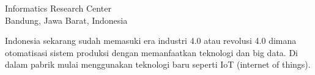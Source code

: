 

{Informatics Research Center\\
Bandung, Jawa Barat, Indonesia}

Indonesia sekarang sudah memasuki era industri 4.0 atau revolusi 4.0 dimana otomatisasi sistem produksi dengan memanfaatkan teknologi dan big data. Di dalam pabrik mulai menggunakan teknologi baru seperti IoT (internet of things).
